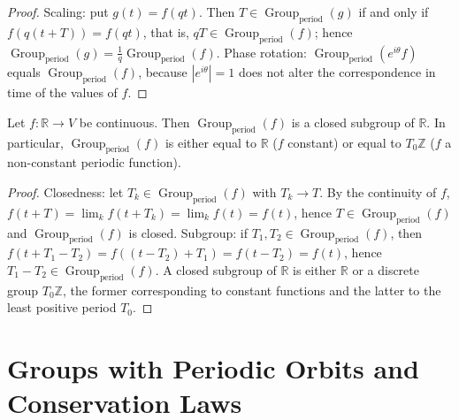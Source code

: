 \begin{proof}
Scaling: put $g(t)=f(qt)$. Then $T\in\operatorname{Group}_{\mathrm{period}}(g)$ if and only if $f(q(t+T))=f(qt)$, that is, $qT\in\operatorname{Group}_{\mathrm{period}}(f)$; hence $\operatorname{Group}_{\mathrm{period}}(g)=\frac{1}{q}\operatorname{Group}_{\mathrm{period}}(f)$. Phase rotation: $\operatorname{Group}_{\mathrm{period}}(e^{i\theta}f)$ equals $\operatorname{Group}_{\mathrm{period}}(f)$, because $|e^{i\theta}|=1$ does not alter the correspondence in time of the values of $f$.
\end{proof}

\begin{proposition}\label{prop:group_with_periodic_orbits_closed}
Let $f:\mathbb{R}\to V$ be continuous. Then $\operatorname{Group}_{\mathrm{period}}(f)$ is a closed subgroup of $\mathbb{R}$. In particular, $\operatorname{Group}_{\mathrm{period}}(f)$ is either equal to $\mathbb{R}$ ($f$ constant) or equal to $T_0\mathbb{Z}$ ($f$ a non-constant periodic function).
\end{proposition}

\begin{proof}
Closedness: let $T_k\in\operatorname{Group}_{\mathrm{period}}(f)$ with $T_k\to T$. By the continuity of $f$, $f(t+T)=\lim_k f(t+T_k)=\lim_k f(t)=f(t)$, hence $T\in\operatorname{Group}_{\mathrm{period}}(f)$ and $\operatorname{Group}_{\mathrm{period}}(f)$ is closed. Subgroup: if $T_1,T_2\in\operatorname{Group}_{\mathrm{period}}(f)$, then $f(t+T_1-T_2)=f((t-T_2)+T_1)=f(t-T_2)=f(t)$, hence $T_1-T_2\in\operatorname{Group}_{\mathrm{period}}(f)$. A closed subgroup of $\mathbb{R}$ is either $\mathbb{R}$ or a discrete group $T_0\mathbb{Z}$, the former corresponding to constant functions and the latter to the least positive period $T_0$.
\end{proof}

\section{Groups with Periodic Orbits and Conservation Laws}

